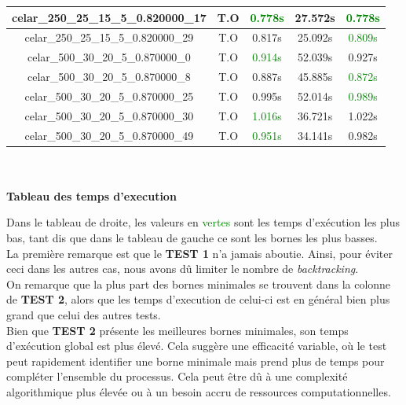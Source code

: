 \documentclass[a4paper, 10pt]{article}
\begin{document}
\begin{minipage}[t]{0.6\linewidth}
\begin{tabular}{| c | c | c| c| c |}
           \hline
           celar\_250\_25\_15\_5\_0.820000\_17 & \textcolor[gray]{0.6}{T.O} &\textcolor{green}{0.778s} & 27.572s & \textcolor{green}{0.778s} \\
           \hline
           celar\_250\_25\_15\_5\_0.820000\_29 & \textcolor[gray]{0.6}{T.O}  &  0.817s & 25.092s & \textcolor{green}{0.809s} \\
           \hline
           celar\_500\_30\_20\_5\_0.870000\_0 & \textcolor[gray]{0.6}{T.O} & \textcolor{green}{0.914s} & 52.039s & 0.927s  \\
           \hline
           celar\_500\_30\_20\_5\_0.870000\_8 & \textcolor[gray]{0.6}{T.O} & 0.887s & 45.885s & \textcolor{green}{0.872s} \\
           \hline
           celar\_500\_30\_20\_5\_0.870000\_25 & \textcolor[gray]{0.6}{T.O} & 0.995s & 52.014s & \textcolor{green}{0.989s} \\
           \hline
           celar\_500\_30\_20\_5\_0.870000\_30 & \textcolor[gray]{0.6}{T.O} &  \textcolor{green}{1.016s} & 36.721s & 1.022s \\
           \hline
           celar\_500\_30\_20\_5\_0.870000\_49 &\textcolor[gray]{0.6}{T.O}  &  \textcolor{green}{0.951s} & 34.141s & 0.982s \\
           \hline
         \end{tabular}
         ~\\\\
         \centering
         \textbf{\large Tableau des temps d'execution} %
       \end{minipage}

       Dans le tableau de droite, les valeurs en \textcolor{green}{vertes} sont les temps d'exécution les plus bas, tant dis que dans le tableau de gauche ce sont les bornes les plus basses. \\
       
       La première remarque est que le \textbf{TEST 1} n'a jamais aboutie. Ainsi, pour éviter ceci dans les autres cas, nous avons dû limiter le nombre de \textit{backtracking}. \\
       
       On remarque que la plus part des bornes minimales se trouvent dans la colonne de \textbf{TEST 2}, alors que les temps d'execution de celui-ci est en général bien plus grand que celui des autres tests. \\
       
       Bien que \textbf{TEST 2} présente les meilleures bornes minimales, son temps d'exécution global est plus élevé. Cela suggère une efficacité variable, où le test peut rapidement identifier une borne minimale mais prend plus de temps pour compléter l'ensemble du processus. Cela peut être dû à une complexité algorithmique plus élevée ou à un besoin accru de ressources computationnelles. \\
       
\end{document}
